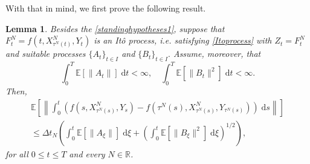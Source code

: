 \documentclass[reqno,12pt]{amsart}
\theoremstyle{plain} %
\newtheorem{lemma}{Lemma}[section]
\theoremstyle{definition} %
\begin{document}
With that in mind, we first prove the following result.
\begin{lemma}
    \label{lemItostep}
    Besides the \cref{standinghypotheses1}, suppose that $F_t^N = f(t, X_{\tau^N(t)}^N, Y_t)$ is an It\^o process, i.e. satisfying \eqref{Itoprocess} with $Z_t = F_t^N$ and suitable processes $\{A_t\}_{t\in I}$ and $\{B_t\}_{t\in I}.$ Assume, moreover, that
    \begin{equation}
        \label{expectItostepterms}
        \int_0^T \mathbb{E}[\|A_t\|] \;\mathrm{d}t < \infty, \quad \int_0^T \mathbb{E}[\|B_t\|^2] \;\mathrm{d}t < \infty.
    \end{equation}
    Then,
    \begin{multline}
        \label{expectintfboundbyIto}
        \mathbb{E}\left[\left\|\int_0^t \left(f(s, X_{\tau^N(s)}^N, Y_s) - f(\tau^N(s), X_{\tau^N(s)}^N, Y_{\tau^N(s)})\right)\;\mathrm{d}s\right\|\right]  \\
        \leq \Delta t_N \left(\int_0^t \mathbb{E}[\|A_\xi\|] \;\mathrm{d}\xi + \left(\int_0^t \mathbb{E}[\|B_\xi\|^2] \;\mathrm{d}\xi \right)^{1/2}\right),
    \end{multline}
    for all $0 \leq t \leq T$ and every $N\in \mathbb{R}$.
\end{lemma}
\end{document}

